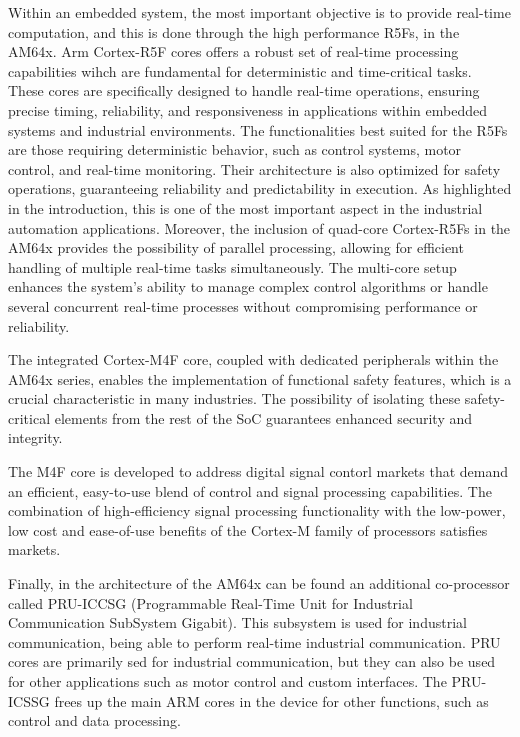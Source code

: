 Within an embedded system, the most important objective is to provide real-time
computation, and this is done through the high performance R5Fs, in the AM64x.
Arm Cortex-R5F cores offers a robust set of real-time processing capabilities
wihch are fundamental for deterministic and time-critical tasks.
These cores are specifically designed to handle real-time operations, ensuring
precise timing, reliability, and responsiveness in applications within embedded
systems and industrial environments.
The functionalities best suited for the R5Fs are those requiring deterministic
behavior, such as control systems, motor control, and real-time monitoring.
Their architecture is also optimized for safety operations, guaranteeing 
reliability and predictability in execution.
As highlighted in the introduction, this is one of the most important aspect
in the industrial automation applications.
Moreover, the inclusion of quad-core Cortex-R5Fs in the AM64x provides the
possibility of parallel processing, allowing for efficient handling of multiple
real-time tasks simultaneously. The multi-core setup enhances the system's
ability to manage complex control algorithms or handle several concurrent
real-time processes without compromising performance or reliability.

The integrated Cortex-M4F core, coupled with dedicated peripherals within the
AM64x series, enables the implementation of functional safety features,
which is a crucial characteristic in many industries.
The possibility of isolating these safety-critical elements from the rest
of the SoC guarantees enhanced security and integrity.

The M4F core is developed to address digital signal contorl markets that demand
an efficient, easy-to-use blend of control and signal processing capabilities.
\cite{ARM_M4}
The combination of high-efficiency signal processing functionality with the
low-power, low cost and ease-of-use benefits of the Cortex-M family of
processors satisfies markets.

Finally, in the architecture of the AM64x can be found an additional
co-processor called PRU-ICCSG (Programmable Real-Time Unit for Industrial
Communication SubSystem Gigabit). This subsystem is used for industrial
communication, being able to perform real-time industrial communication.
PRU cores are primarily sed for industrial communication, but they can also
be used for other applications such as motor control and custom interfaces.
The PRU-ICSSG frees up the main ARM cores in the device for other functions,
such as control and data processing.

